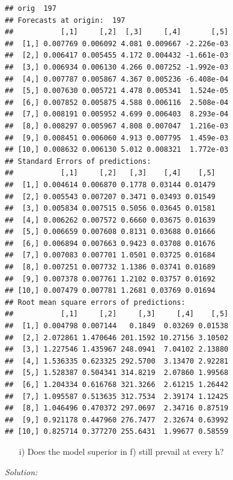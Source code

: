 \documentclass[12pt,a4paper]{article}
\newenvironment{Shaded}{\begin{snugshade}}{\end{snugshade}}
\newcommand{\FloatTok}[1]{\textcolor[rgb]{0.00,0.00,0.81}{#1}}
\newcommand{\NormalTok}[1]{#1}
\newcommand{\OperatorTok}[1]{\textcolor[rgb]{0.81,0.36,0.00}{\textbf{#1}}}
\newcommand{\StringTok}[1]{\textcolor[rgb]{0.31,0.60,0.02}{#1}}
\begin{document}
\begin{verbatim}
## orig  197 
## Forecasts at origin:  197 
##           [,1]     [,2]  [,3]     [,4]       [,5]
##  [1,] 0.007769 0.006092 4.081 0.009667 -2.226e-03
##  [2,] 0.006417 0.005455 4.172 0.004432 -1.661e-03
##  [3,] 0.006934 0.006130 4.266 0.007252 -1.992e-03
##  [4,] 0.007787 0.005867 4.367 0.005236 -6.408e-04
##  [5,] 0.007630 0.005721 4.478 0.005341  1.524e-05
##  [6,] 0.007852 0.005875 4.588 0.006116  2.508e-04
##  [7,] 0.008191 0.005952 4.699 0.006403  8.293e-04
##  [8,] 0.008297 0.005967 4.808 0.007047  1.216e-03
##  [9,] 0.008451 0.006060 4.913 0.007795  1.459e-03
## [10,] 0.008632 0.006130 5.012 0.008321  1.772e-03
## Standard Errors of predictions:  
##           [,1]     [,2]   [,3]    [,4]    [,5]
##  [1,] 0.004614 0.006870 0.1778 0.03144 0.01479
##  [2,] 0.005543 0.007207 0.3471 0.03493 0.01549
##  [3,] 0.005834 0.007515 0.5056 0.03645 0.01581
##  [4,] 0.006262 0.007572 0.6660 0.03675 0.01639
##  [5,] 0.006659 0.007608 0.8131 0.03688 0.01666
##  [6,] 0.006894 0.007663 0.9423 0.03708 0.01676
##  [7,] 0.007083 0.007701 1.0501 0.03725 0.01684
##  [8,] 0.007251 0.007732 1.1386 0.03741 0.01689
##  [9,] 0.007378 0.007761 1.2102 0.03757 0.01692
## [10,] 0.007479 0.007781 1.2681 0.03769 0.01694
## Root mean square errors of predictions:  
##           [,1]     [,2]     [,3]     [,4]    [,5]
##  [1,] 0.004798 0.007144   0.1849  0.03269 0.01538
##  [2,] 2.072861 1.470646 201.1592 10.27156 3.10502
##  [3,] 1.227546 1.435967 248.0941  7.04102 2.13880
##  [4,] 1.536335 0.623325 292.5700  3.13470 2.92281
##  [5,] 1.528387 0.504341 314.8219  2.07860 1.99568
##  [6,] 1.204334 0.616768 321.3266  2.61215 1.26442
##  [7,] 1.095587 0.513635 312.7534  2.39174 1.12425
##  [8,] 1.046496 0.470372 297.0697  2.34716 0.87519
##  [9,] 0.921178 0.447960 276.7477  2.32674 0.63992
## [10,] 0.825714 0.377270 255.6431  1.99677 0.58559
\end{verbatim}

\begin{itemize}
  \item[i)] Does the model superior in f) still prevail at every h?
\end{itemize}

\emph{Solution:}

\begin{Shaded}
\end{Shaded}
\end{document}

